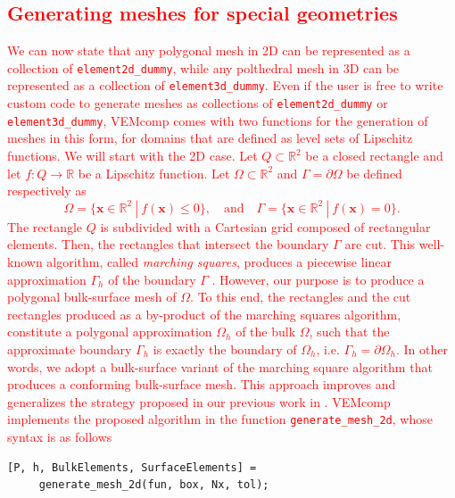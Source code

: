 \documentclass[a4paper]{article}
\newcommand{\boldx}{\boldsymbol{x}}
\newcommand{\red}[1]{\textcolor{red}{#1}}
\begin{document}
\subsection{\red{Generating meshes for special geometries}}
\label{sec:mesh_generation}
\red{We can now state that any polygonal mesh in 2D can be represented as a collection of \texttt{element2d\_dummy}, while any polthedral mesh in 3D can be represented as a collection of \texttt{element3d\_dummy}.  Even if the user is free to write custom code to generate meshes as collections of \texttt{element2d\_dummy} or \texttt{element3d\_dummy},  VEMcomp comes with two functions for the generation of meshes in this form, for domains that are defined as level sets of Lipschitz functions.  We will start with the 2D case. Let $Q \subset\mathbb{R}^2$ be a closed rectangle and let $f: Q \rightarrow\mathbb{R}$ be a Lipschitz function.  Let $\Omega \subset\mathbb{R}^2$ and $\Gamma = \partial \Omega$ be defined respectively as
\begin{equation}
\label{level_set_2d}
\Omega = \{\boldx\in\mathbb{R}^2\ |\ f(\boldx) \le 0\}, \quad \text{and}\quad \Gamma = \{\boldx\in\mathbb{R}^2\ |\ f(\boldx) = 0\}.
\end{equation}
The rectangle $Q$ is subdivided with a Cartesian grid composed of rectangular elements. Then, the rectangles that intersect the boundary $\Gamma$ are cut. This well-known algorithm,  called	\emph{marching squares}, produces a piecewise linear approximation $\Gamma_h$ of the boundary $\Gamma$ \cite{lorensen1987marching}. However, our purpose is to produce a polygonal bulk-surface mesh of $\Omega$. To this end,  the rectangles and the cut rectangles produced as a by-product of the marching squares algorithm, constitute a polygonal approximation $\Omega_h$ of the bulk $\Omega$, such that the approximate boundary $\Gamma_h$ is exactly the boundary of $\Omega_h$, i.e. $\Gamma_h = \partial \Omega_h$. In other words,  we adopt a bulk-surface variant of the marching square algorithm that produces a conforming bulk-surface mesh. This approach improves and generalizes the strategy proposed in our previous work in \cite{frittelli2021bulk}. VEMcomp implements the proposed algorithm in the function \texttt{generate\_mesh\_2d}, whose syntax is as follows}
\begin{lstlisting}
[P, h, BulkElements, SurfaceElements] =
     generate_mesh_2d(fun, box, Nx, tol);
\end{lstlisting}
\end{document}
